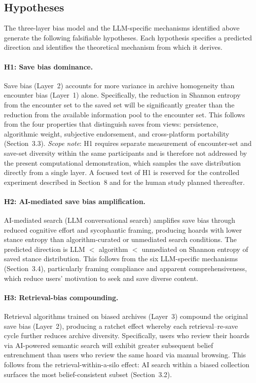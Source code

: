 \documentclass[12pt,a4paper]{article}
\begin{document}
\subsection{Hypotheses}

The three-layer bias model and the LLM-specific mechanisms identified above generate the following falsifiable hypotheses.
Each hypothesis specifies a predicted direction and identifies the theoretical mechanism from which it derives.

\paragraph{H1: Save bias dominance.}
Save bias (Layer~2) accounts for more variance in archive homogeneity than encounter bias (Layer~1) alone.
Specifically, the reduction in Shannon entropy from the encounter set to the saved set will be significantly greater than the reduction from the available information pool to the encounter set.
This follows from the four properties that distinguish saves from views: persistence, algorithmic weight, subjective endorsement, and cross-platform portability (Section~3.3).
\textit{Scope note}: H1 requires separate measurement of encounter-set and save-set diversity within the same participants and is therefore not addressed by the present computational demonstration, which samples the save distribution directly from a single layer.
A focused test of H1 is reserved for the controlled experiment described in Section~8 and for the human study planned thereafter.

\paragraph{H2: AI-mediated save bias amplification.}
AI-mediated search (LLM conversational search) amplifies save bias through reduced cognitive effort and sycophantic framing, producing hoards with lower stance entropy than algorithm-curated or unmediated search conditions.
The predicted direction is LLM $<$ algorithm $<$ unmediated on Shannon entropy of saved stance distribution.
This follows from the six LLM-specific mechanisms (Section~3.4), particularly framing compliance and apparent comprehensiveness, which reduce users' motivation to seek and save diverse content.

\paragraph{H3: Retrieval-bias compounding.}
Retrieval algorithms trained on biased archives (Layer~3) compound the original save bias (Layer~2), producing a ratchet effect whereby each retrieval--re-save cycle further reduces archive diversity.
Specifically, users who review their hoards via AI-powered semantic search will exhibit greater subsequent belief entrenchment than users who review the same hoard via manual browsing.
This follows from the retrieval-within-a-silo effect: AI search within a biased collection surfaces the most belief-consistent subset (Section~3.2).
\end{document}
